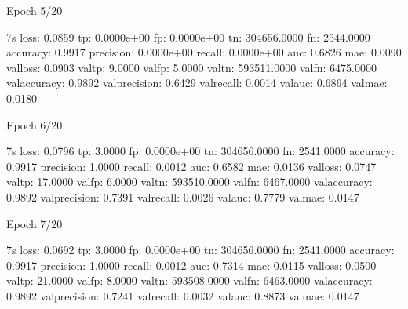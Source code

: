\documentclass[letterpaper,10pt,english]{sphinxmanual}
\begin{document}
\begin{sphinxVerbatim}[commandchars=\\\{\}]
Epoch 5/20
\end{sphinxVerbatim}

\begin{sphinxVerbatim}[commandchars=\\\{\}]
 \PYGZhy{} 7s \PYGZhy{} loss: 0.0859 \PYGZhy{} tp: 0.0000e+00 \PYGZhy{} fp: 0.0000e+00 \PYGZhy{} tn: 304656.0000 \PYGZhy{} fn: 2544.0000 \PYGZhy{} accuracy: 0.9917 \PYGZhy{} precision: 0.0000e+00 \PYGZhy{} recall: 0.0000e+00 \PYGZhy{} auc: 0.6826 \PYGZhy{} mae: 0.0090 \PYGZhy{} val\PYGZus{}loss: 0.0903 \PYGZhy{} val\PYGZus{}tp: 9.0000 \PYGZhy{} val\PYGZus{}fp: 5.0000 \PYGZhy{} val\PYGZus{}tn: 593511.0000 \PYGZhy{} val\PYGZus{}fn: 6475.0000 \PYGZhy{} val\PYGZus{}accuracy: 0.9892 \PYGZhy{} val\PYGZus{}precision: 0.6429 \PYGZhy{} val\PYGZus{}recall: 0.0014 \PYGZhy{} val\PYGZus{}auc: 0.6864 \PYGZhy{} val\PYGZus{}mae: 0.0180
\end{sphinxVerbatim}

\begin{sphinxVerbatim}[commandchars=\\\{\}]
Epoch 6/20
\end{sphinxVerbatim}

\begin{sphinxVerbatim}[commandchars=\\\{\}]
 \PYGZhy{} 7s \PYGZhy{} loss: 0.0796 \PYGZhy{} tp: 3.0000 \PYGZhy{} fp: 0.0000e+00 \PYGZhy{} tn: 304656.0000 \PYGZhy{} fn: 2541.0000 \PYGZhy{} accuracy: 0.9917 \PYGZhy{} precision: 1.0000 \PYGZhy{} recall: 0.0012 \PYGZhy{} auc: 0.6582 \PYGZhy{} mae: 0.0136 \PYGZhy{} val\PYGZus{}loss: 0.0747 \PYGZhy{} val\PYGZus{}tp: 17.0000 \PYGZhy{} val\PYGZus{}fp: 6.0000 \PYGZhy{} val\PYGZus{}tn: 593510.0000 \PYGZhy{} val\PYGZus{}fn: 6467.0000 \PYGZhy{} val\PYGZus{}accuracy: 0.9892 \PYGZhy{} val\PYGZus{}precision: 0.7391 \PYGZhy{} val\PYGZus{}recall: 0.0026 \PYGZhy{} val\PYGZus{}auc: 0.7779 \PYGZhy{} val\PYGZus{}mae: 0.0147
\end{sphinxVerbatim}

\begin{sphinxVerbatim}[commandchars=\\\{\}]
Epoch 7/20
\end{sphinxVerbatim}

\begin{sphinxVerbatim}[commandchars=\\\{\}]
 \PYGZhy{} 7s \PYGZhy{} loss: 0.0692 \PYGZhy{} tp: 3.0000 \PYGZhy{} fp: 0.0000e+00 \PYGZhy{} tn: 304656.0000 \PYGZhy{} fn: 2541.0000 \PYGZhy{} accuracy: 0.9917 \PYGZhy{} precision: 1.0000 \PYGZhy{} recall: 0.0012 \PYGZhy{} auc: 0.7314 \PYGZhy{} mae: 0.0115 \PYGZhy{} val\PYGZus{}loss: 0.0500 \PYGZhy{} val\PYGZus{}tp: 21.0000 \PYGZhy{} val\PYGZus{}fp: 8.0000 \PYGZhy{} val\PYGZus{}tn: 593508.0000 \PYGZhy{} val\PYGZus{}fn: 6463.0000 \PYGZhy{} val\PYGZus{}accuracy: 0.9892 \PYGZhy{} val\PYGZus{}precision: 0.7241 \PYGZhy{} val\PYGZus{}recall: 0.0032 \PYGZhy{} val\PYGZus{}auc: 0.8873 \PYGZhy{} val\PYGZus{}mae: 0.0147
\end{sphinxVerbatim}
\end{document}
